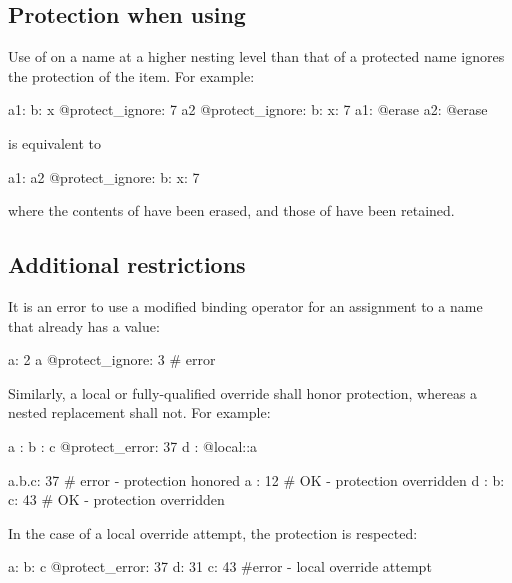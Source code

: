 \documentclass[draftmode,draftwater]{memarticle}
\makeatletter
\newcommand{\aterase}{\fclcode{@erase}\xspace}
\makeatother
\begin{document}
\subsection{Protection when using \aterase}

Use of \aterase on a name at a higher nesting level than that of a
protected name ignores the protection of the item.  For example:
%
\Needspace{0.34in}
\begin{fcllisting}[texcl,escapechar=`]
a1: { b: { x @protect_ignore: 7 } }
a2 @protect_ignore: { b: { x: 7 } }
a1: @erase
a2: @erase
\end{fcllisting}
%
is equivalent to
%
\Needspace{0.34in}
\begin{fcllisting}[texcl,escapechar=`]
a1: {}
a2 @protect_ignore: { b: { x: 7 } }
\end{fcllisting}
%
where the contents of  have been erased, and those of
 have been retained.

\subsection{Additional restrictions}

It is an error to use a modified binding operator for an assignment to
a name that already has a value:
%
\Needspace{0.34in}
\begin{fcllisting}[texcl,escapechar=`]
a: 2
a @protect_ignore: 3 # error
\end{fcllisting}
%

Similarly, a local or fully-qualified override shall honor protection,
whereas a nested replacement shall not. For example:
%
\Needspace{0.34in}
\begin{fcllisting}[texcl,escapechar=`]
a    : { b : { c @protect_error: 37 } }
d    : @local::a

a.b.c: 37               # error - protection honored
a    : 12               # OK    - protection overridden
d    : { b: { c: 43 } } # OK    - protection overridden
\end{fcllisting}

In the case of a local override attempt, the protection is respected:
%
\Needspace{0.34in}
\begin{fcllisting}[texcl,escapechar=`]
a: {
   b: {
      c @protect_error: 37
      d: 31
      c: 43  #error - local override attempt
   }
}
\end{fcllisting}

\end{document}
